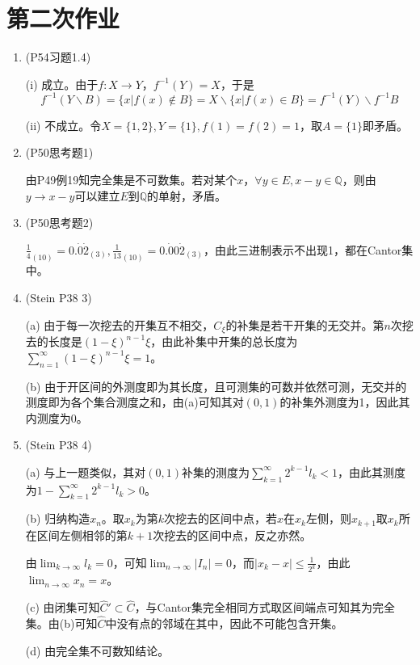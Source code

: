 \documentclass[a4paper,UTF8,fontset=windows]{ctexart}
\begin{document}
\section{第二次作业}
\begin{enumerate}
    \item (P54习题1.4)
    
    (i) 成立。由于$f:X\to Y$，$f^{-1}(Y)=X$，于是
    \[f^{-1}(Y\backslash B)=\{x|f(x)\notin B\}=X\backslash\{x|f(x)\in B\}=f^{-1}(Y)\backslash f^{-1}B\]
    
    (ii) 不成立。令$X=\{1,2\},Y=\{1\},f(1)=f(2)=1$，取$A=\{1\}$即矛盾。
    
    \item (P50思考题1)
    
    由P49例19知完全集是不可数集。若对某个$x$，$\forall y\in E,x-y\in\mathbb{Q}$，则由$y\to x-y$可以建立$E$到$\mathbb{Q}$的单射，矛盾。
    
    \item (P50思考题2)
    
    $\frac{1}{4}_{(10)}=0.\dot{0}\dot{2}_{(3)},\frac{1}{13}_{(10)}=0.\dot{0}0\dot{2}_{(3)}$，由此三进制表示不出现1，都在Cantor集中。
    
    \item (Stein P38 3)
    
    (a) 由于每一次挖去的开集互不相交，$C_\xi$的补集是若干开集的无交并。第$n$次挖去的长度是$(1-\xi)^{n-1}\xi$，由此补集中开集的总长度为$\sum_{n=1}^\infty (1-\xi)^{n-1}\xi=1$。
    
    (b) 由于开区间的外测度即为其长度，且可测集的可数并依然可测，无交并的测度即为各个集合测度之和，由(a)可知其对$(0,1)$的补集外测度为1，因此其内测度为0。
    
    \item (Stein P38 4)
    
    (a) 与上一题类似，其对$(0,1)$补集的测度为$\sum_{k=1}^\infty 2^{k-1}l_k<1$，由此其测度为$1-\sum_{k=1}^\infty 2^{k-1}l_k>0$。
    
    (b) 归纳构造$x_n$。取$x_k$为第$k$次挖去的区间中点，若$x$在$x_k$左侧，则$x_{k+1}$取$x_k$所在区间左侧相邻的第$k+1$次挖去的区间中点，反之亦然。
    
    由$\lim_{k\to\infty}l_k=0$，可知$\lim_{n\to\infty}|I_n|=0$，而$|x_k-x|\le\frac{1}{2^k}$，由此$\lim_{n\to\infty}x_n=x$。
    
    (c) 由闭集可知$\hat{C}'\subset\hat{C}$，与Cantor集完全相同方式取区间端点可知其为完全集。由(b)可知$\hat{C}$中没有点的邻域在其中，因此不可能包含开集。
    
    (d) 由完全集不可数知结论。
\end{enumerate}
\end{document}
